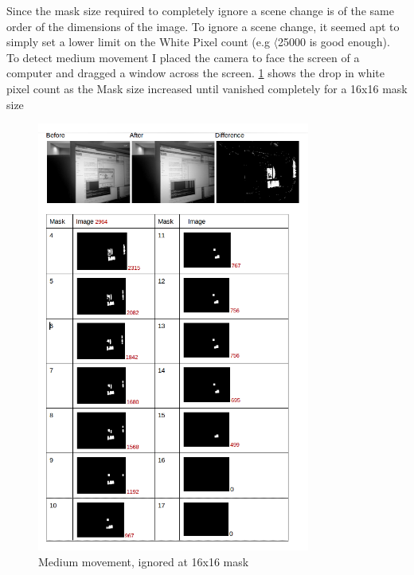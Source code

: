 \documentclass[11pt]{article} %
\begin{document}
{{Since the mask size required to completely ignore a scene change is of the same order of the dimensions of the image.  To ignore a scene change, it seemed apt to simply set a lower limit on the White Pixel count (e.g \(\langle\)25000 is good enough).
\\To detect medium movement I placed the camera to face the screen of a computer and dragged a window across the screen. \cref{img:medium} shows the drop in white pixel count as the Mask size increased until vanished completely for a 16x16 mask size
\begin{figure}[H]
	\vspace{-12pt}
	\begin{center}
		\includegraphics[width=0.8\textwidth]{../images/ImageOps/LARGE}
	\end{center}
	\vspace{-30pt}
	\caption{Medium movement, ignored at 16x16 mask}
	\label{img:medium}
	\vspace{-40pt}
\end{figure}

}}
\end{document}

